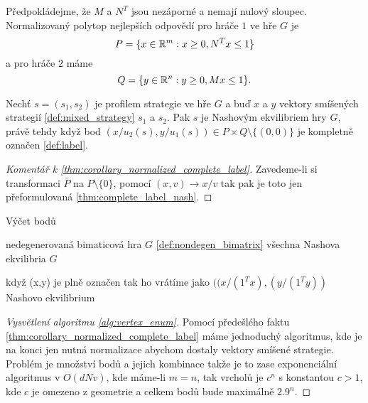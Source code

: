 \begin{definition}
\label{def:norm_best_response_poly}
Předpokládejme, že $M$ a $N^T$ jsou nezáporné a nemají nulový sloupec. 
Normalizovaný polytop nejlepších odpovědí pro hráče $1$ ve hře $G$ je 
$$
P = \{x\in \mathbb{R}^m: x \geq 0, N^Tx \leq 1\}
$$ 
a pro hráče $2$ máme
$$
Q = \{y\in \mathbb{R}^n: y \geq 0, Mx \leq 1\}.
$$
\end{definition}

\begin{theorem}
\label{thm:corollary_normalized_complete_label}
Nechť $s = (s_1, s_2)$ je profilem strategie ve hře $G$ a buď $x$ a  $y$ vektory smíšených strategií \ref{def:mixed_strategy} $s_1$ a $s_2$.
Pak $s$ je Nashovým ekvilibriem hry $G$, právě tehdy když bod $(x/u_2(s), y/u_1(s)) \in P \times Q \setminus \{(0,0)\}$ je kompletně označen \ref{def:label}.
\end{theorem}
\begin{proof}[Komentář k \ref{thm:corollary_normalized_complete_label}]
    Zavedeme-li si transformaci $\bar{P}$ na $P \setminus \{0\}$, pomocí $(x,v)\rightarrow x/v$ tak pak je toto jen přeformulovaná \ref{thm:complete_label_nash}. 
\end{proof}

\begin{algorithm}
    \algrenewcommand{}
    \algrenewcommand{}
    \caption{Výčet bodů}
    \label{alg:vertex_enum}
    \begin{algorithmic}
        \Require  nedegenerovaná bimaticová hra $G$ \ref{def:nondegen_bimatrix}
        \Ensure  všechna Nashova ekvilibria $G$
        
            \State když (x,y) je plně označen tak ho vrátíme jako $((x/(1^Tx),(y/(1^Ty))$ Nashovo ekvilibrium
        \EndFor
    \end{algorithmic}
\end{algorithm}

\begin{proof}[Vysvětlení algoritmu \ref{alg:vertex_enum}]
    Pomocí předešlého faktu \ref{thm:corollary_normalized_complete_label} máme jednoduchý algoritmus, kde je na konci jen nutná normalizace abychom dostaly vektory smíšené strategie.
    Problém je množství bodů a jejich kombinace takže je to zase exponenciální algoritmus v $O(dNv)$, kde máme-li $m = n$, tak vrcholů je $c^n$ s konstantou $c > 1$, kde $c$ je omezeno z geometrie a celkem bodů bude maximálně $2.9^n$. 
\end{proof}
